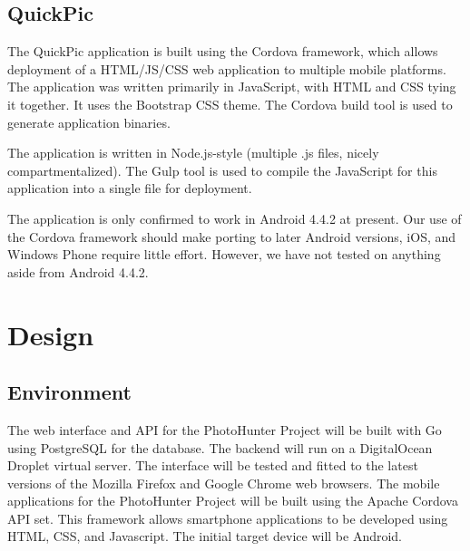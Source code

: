 \documentclass{article}
\begin{document}
\subsection{QuickPic}

The QuickPic application is built using the Cordova framework,
which allows deployment of a HTML/JS/CSS web application to multiple mobile
platforms. The application was written primarily in JavaScript, with HTML and
CSS tying it together. It uses the Bootstrap CSS theme. The Cordova build tool is used to generate application
binaries.

The application is written in Node.js-style (multiple .js files, nicely
compartmentalized). The Gulp tool is used to compile the JavaScript
for this application into a single file for deployment.

The application is only confirmed to work in Android 4.4.2 at present. Our use
of the Cordova framework should make porting to later Android versions, iOS,
and Windows Phone require little effort. However, we have not tested on
anything aside from Android 4.4.2.




\section{Design}
\subsection{Environment}
The web interface and API for the PhotoHunter Project will be built with Go
using PostgreSQL for the database. The backend will run on a DigitalOcean
Droplet virtual server. The interface will be tested and fitted to the latest
versions of the Mozilla Firefox and Google Chrome web browsers. The mobile
applications for the PhotoHunter Project will be built using the Apache Cordova
API set. This framework allows smartphone applications to be developed using
HTML, CSS, and Javascript. The initial target device will be Android.
\end{document}
